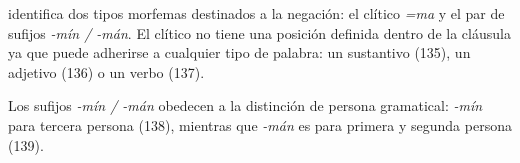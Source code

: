 \textcolor{MidnightBlue}{\citet{kakataibo}} identifica dos tipos morfemas destinados a la negación: el clítico {\setmainfont{Charis SIL} \textit{=ma}} y el par de sufijos {\setmainfont{Charis SIL} \textit{-mín / -mán}}. El clítico no tiene una posición definida dentro de la cláusula ya que puede adherirse a cualquier tipo de palabra: un sustantivo (135), un adjetivo (136) o un verbo (137).

Los sufijos {\setmainfont{Charis SIL} \textit{-mín / -mán}} obedecen a la distinción de persona gramatical: {\setmainfont{Charis SIL} \textit{-mín}} para tercera persona (138), mientras que {\setmainfont{Charis SIL} \textit{-mán}} es para primera y segunda persona (139).